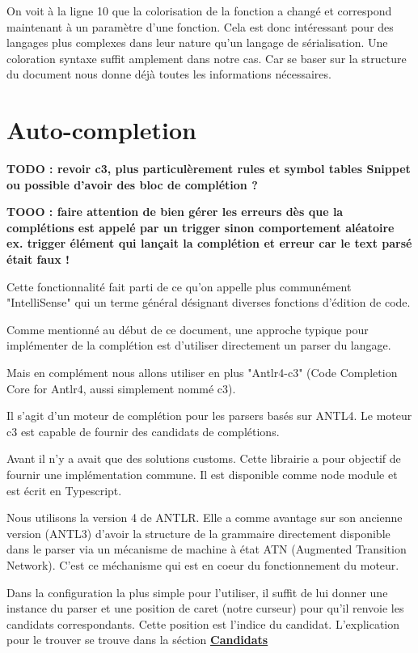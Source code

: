 \documentclass[
    iict, %
    il, %
]{heig-tb}
\begin{document}
On voit à la ligne 10 que la colorisation de la fonction a changé et correspond maintenant à un paramètre d'une fonction.
Cela est donc intéressant pour des langages plus complexes dans leur nature qu'un langage de sérialisation. Une coloration syntaxe suffit amplement dans notre cas.
Car se baser sur la structure du document nous donne déjà toutes les informations nécessaires.

\section{Auto-completion}

\textbf{TODO : revoir c3, plus particulèrement rules et symbol tables
    Snippet ou possible d'avoir des bloc de complétion ?}

\textbf{TOOO : faire attention de bien gérer les erreurs dès que la complétions est appelé par un trigger sinon comportement aléatoire
    ex. trigger élément qui lançait la complétion et erreur car le text parsé était faux !
}

Cette fonctionnalité fait parti de ce qu'on appelle plus communément "IntelliSense" \cite{intelliSense} qui un terme général désignant diverses fonctions d'édition de code.

Comme mentionné au début de ce document, une approche typique pour implémenter de la complétion est d'utiliser directement un parser du langage.

Mais en complément nous allons utiliser en plus "Antlr4-c3" (Code Completion Core for Antlr4, aussi simplement nommé c3).

Il s'agit d'un moteur de complétion pour les parsers basés sur ANTL4. Le moteur c3 est capable de fournir des candidats de complétions.

Avant il n'y a avait que des solutions customs. Cette librairie a pour objectif de fournir une implémentation commune. Il est disponible comme node module et est écrit en Typescript.

Nous utilisons la version 4 de ANTLR. Elle a comme avantage sur son ancienne version (ANTL3) d'avoir la structure de la grammaire directement disponible dans le parser via
un mécanisme de machine à état ATN (Augmented Transition Network). C'est ce méchanisme qui est en coeur du fonctionnement du moteur.

Dans la configuration la plus simple pour l'utiliser, il suffit de lui donner une instance du parser et une position de caret (notre curseur) pour qu'il renvoie les candidats correspondants.
Cette position est l'indice du candidat. L'explication pour le trouver se trouve dans la séction \hyperref[candidates]{\textbf{Candidats}}
\end{document}
